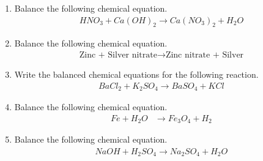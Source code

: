 \begin{enumerate}[label=\thesubsection.\arabic*.,ref=\thesubsection.\theenumi]
\item     Balance the following chemical equation.
    \begin{align}
        \label{eq:solutions/chem/6ato balance} HNO_{3}+ Ca(OH)_{2}\to Ca(NO_{3})_{2}+H_{2}O
    \end{align}
\solution

%
\item    Balance the following chemical equation.
    \begin{align}
        \label{eq:solutions/chem/7b1} \text{Zinc + Silver nitrate} \to \text{Zinc nitrate + Silver}
    \end{align}
\solution

\item Write the balanced chemical equations for the following reaction. 
\begin{align}
 BaCl_2 + K_2SO_4 \rightarrow BaSO_4 + KCl \label{eq:solutions/chemistry/7d:1}   
\end{align}
%
\item Balance the following chemical equation.
%
\begin{align}
\label{eq:chem_balance}
Fe+H_2O &\rightarrow Fe_3O_4 + H_2
\end{align}
%
\item Balance the following chemical equation.
\begin{align}
  \label{matrix/50/eq1}
NaOH + H_2SO_4 \xrightarrow{} Na_2SO_4  +  H_2O
\end{align}
%
\end{enumerate}
 


